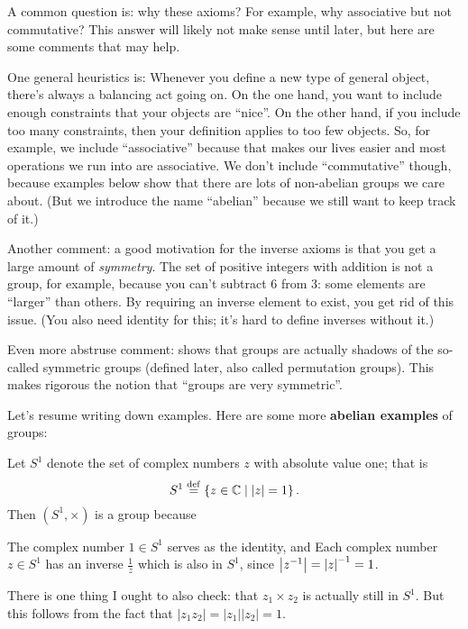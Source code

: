 \begin{remark}
	[Digression]
	A common question is: why these axioms?
	For example, why associative but not commutative?
	This answer will likely not make sense until later,
	but here are some comments that may help.

	One general heuristics is:
	Whenever you define a new type of general object,
	there's always a balancing act going on.
	On the one hand, you want to include enough constraints that your
	objects are ``nice''.
	On the other hand, if you include too many constraints,
	then your definition applies to too few objects.
	So, for example, we include ``associative'' because that makes our lives easier
	and most operations we run into are associative.
	We don't include ``commutative'' though, because examples below
	show that there are lots of non-abelian groups we care about.
	(But we introduce the name ``abelian'' because we still want to keep track of it.)

	Another comment: a good motivation for the inverse axioms
	is that you get a large amount of \emph{symmetry}.
	The set of positive integers with addition is not a group,
	for example, because you can't subtract $6$ from $3$:
	some elements are ``larger'' than others.
	By requiring an inverse element to exist, you get rid of this issue.
	(You also need identity for this;
	it's hard to define inverses without it.)

	Even more abstruse comment:
	 shows that groups are actually shadows of
	the so-called symmetric groups (defined later, also called permutation groups).
	This makes rigorous the notion that ``groups are very symmetric''.
\end{remark}



Let's resume writing down examples.
Here are some more \textbf{abelian examples} of groups:
\begin{example}
	Let $S^1$ denote the set of complex numbers $z$ with absolute value one; that is
	\[ S^1 \overset{\mathrm{def}}{=} \left\{ z \in \mathbb C \mid \left\lvert z \right\rvert = 1 \right\}. \]
	Then $(S^1, \times)$ is a group because
	\begin{itemize}
		\ii The complex number $1 \in S^1$ serves as the identity, and
		\ii Each complex number $z \in S^1$ has an inverse $\frac 1z$ which is also in $S^1$, since $\left\lvert z^{-1} \right\rvert = \left\lvert z \right\rvert^{-1} = 1$.
	\end{itemize}
	There is one thing I ought to also check: that $z_1 \times z_2$ is actually still in $S^1$.
	But this follows from the fact that $\left\lvert z_1z_2 \right\rvert = \left\lvert z_1 \right\rvert \left\lvert z_2 \right\rvert = 1$.
\end{example}


